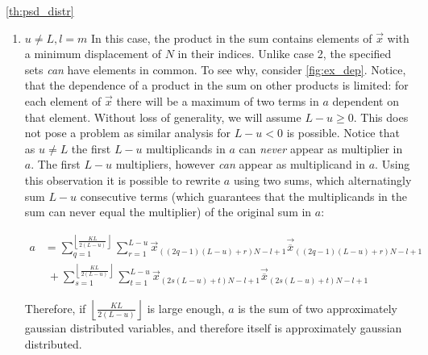 \documentclass[a4paper, openany, oneside]{memoir}
\begin{document}
\begin{blockProofTheorem}{\ref{th:psd_distr}}
\begin{enumerate}
	\begin{align*}
	\bmod(kN-l+1,N) &= \bmod(-l+1, N)
	\end{align*}
	and
	\begin{align*}
	\bmod((k-u+L)N - m+1,N) &= \bmod(-m+1, N)
	\end{align*}
	the product in the sum
	That is $(\vec{x})_{kN-l+1}$  can never equal  $(\vec{x})_{(k-u+L)N - m+1}$ in $a$. Because each element of $\vec{x}$ has the same distribution, the product of two distinct elements in $\vec{x}$ will always yield the same distribution (whatever it may be). By the Central Limit Theorem we can approximate the distribution of the sum as a whole as gaussian if $KL$ is large enough.

	\item $u\neq L, l=m$ In this case, the product in the sum contains elements of $\vec{x}$ with a minimum displacement of $N$ in their indices. Unlike case 2, the specified sets \emph{can} have elements in common. To see why, consider \cref{fig:ex_dep}. Notice, that the dependence of a product in the sum on other products is limited: for each element of $\vec{x}$ there will be a maximum of two terms in $a$ dependent on that element. Without loss of generality, we will assume $L-u \geq 0$. This does not pose a problem as similar analysis for $L-u < 0$ is possible.  Notice that as $u\neq L$ the first $L-u$ multiplicands in $a$ can \emph{never} appear as multiplier in $a$. The first $L-u$ multipliers, however \emph{can} appear as multiplicand in $a$.  Using this observation it is possible to rewrite $a$ using two sums, which alternatingly sum $L-u$ consecutive terms (which guarantees that the multiplicands in the sum can never equal the multiplier) of the original sum in $a$:
	
	\begin{align*}
	a &= \sum_{q=1}^{\left\lfloor{\frac{KL}{2(L-u)}}\right\rfloor} \sum_{r=1}^{L-u} \vec{x}_{((2q-1)(L-u)+r)N-l+1}\vec{\overline{x}}_{((2q-1)(L-u)+r)N-l+1} \\
	   & \;+ \sum_{s=1}^{\left\lfloor{\frac{KL}{2(L-u)}}\right\rfloor} \sum_{t=1}^{L-u} \vec{x}_{(2s(L-u)+t)N-l+1}\vec{\overline{x}}_{(2s(L-u)+t)N-l+1}
	\end{align*}
	
	Therefore, if $\left\lfloor{\frac{KL}{2(L-u)}}\right\rfloor$ is large enough, $a$ is the sum of two approximately gaussian distributed variables, and therefore itself is approximately gaussian distributed.			
\end{enumerate}


\end{blockProofTheorem}
\end{document}
